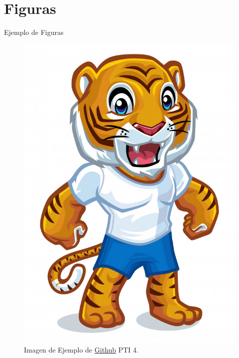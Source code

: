 \documentclass{IFES-beamer}
\begin{document}
\section{Figuras}
\begin{frame}{Ejemplo de Figuras}

\begin{figure}
\centering
\includegraphics[scale=0.25]{Resources/Tigre.jpg}
\caption{Imagen de Ejemplo de \href{https://github.com/Rodas171315/PTI_4-DylanR-LaTeX_Beamer}{Github} PTI 4.}
\end{figure}

\end{frame}
\end{document}
